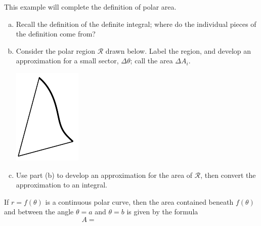 \documentclass[notes]{subfiles}
\begin{document}
		\begin{ex}
			This example will complete the definition of polar area.
			\begin{enumerate}[(a)]
				\item Recall the definition of the definite integral; where do the individual pieces of the definition come from?
					
				\item Consider the polar region $\mathcal{R}$ drawn below.  Label the region, and develop an approximation for a small sector, $\Delta \theta$; call the area $\Delta A_i$.
					\begin{flushleft}

					\includegraphics[scale = 1.5]{104_1.png}
					\end{flushleft}
						\newpage
						
				\item Use part (b) to develop an approximation for the area of $\mathcal{R}$, then convert the approximation to an integral.
			\end{enumerate}
		\end{ex}
		
		\begin{rmk}
			If $r = f(\theta)$ is a continuous polar curve, then the area contained beneath $f(\theta)$ and between the angle $\theta = a$ and $\theta = b$ is given by the formula\\[20pt]
			\[A = \hspace{2in}\]
		\end{rmk}
		
\end{document}
